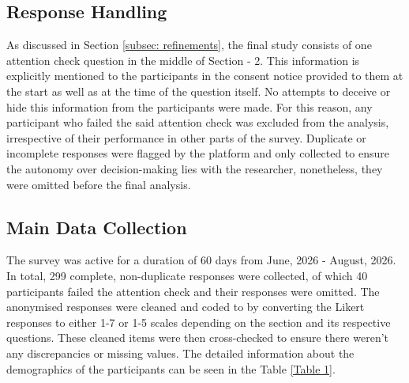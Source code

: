 \subsection{Response Handling} \label{Subsec: response handling}

As discussed in Section \ref{subsec: refinements}, the final study consists of one attention check question in the middle of Section - 2. This information is explicitly mentioned to the participants in the consent notice provided to them at the start as well as at the time of the question itself. No attempts to deceive or hide this information from the participants were made. For this reason, any participant who failed the said attention check was excluded from the analysis, irrespective of their performance in other parts of the survey. Duplicate or incomplete responses were flagged by the platform and only collected to ensure the autonomy over decision-making lies with the researcher, nonetheless, they were omitted before the final analysis. 

\subsection{Main Data Collection} \label{Subsec: Data collection}
The survey was active for a duration of 60 days from June, 2026 - August, 2026. In total, 299 complete, non-duplicate responses were collected, of which 40 participants failed the attention check and their responses were omitted. The anonymised responses were cleaned and coded to by converting the Likert responses to either 1-7 or 1-5 scales depending on the section and its respective questions. These cleaned items were then cross-checked to ensure there weren't any discrepancies or missing values. The detailed information about the demographics of the participants can be seen in the Table \ref{Table 1}.

